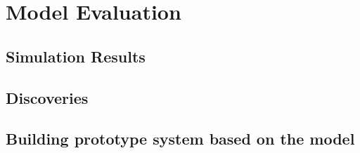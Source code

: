 \chapter{Model Evaluation}
\label{chapter:model-evaluation}

\section{Simulation Results}

\section{Discoveries}

\section{Building prototype system based on the model}

